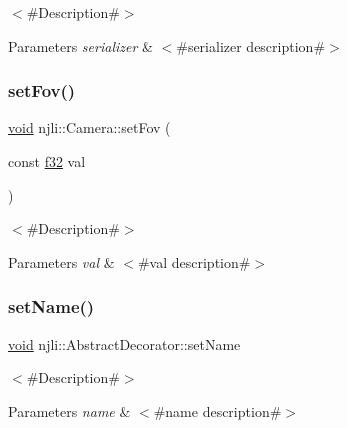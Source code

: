 $<$\#\+Description\#$>$


\begin{DoxyParams}{Parameters}
{\em serializer} & $<$\#serializer description\#$>$ \\
\hline
\end{DoxyParams}
\mbox{\label{classnjli_1_1_camera_a249c6432aa9c8809a92012a272ec6d28}} 
\subsubsection{\texorpdfstring{set\+Fov()}{setFov()}}
{\footnotesize\ttfamily \mbox{\hyperlink{_thread_8h_af1e856da2e658414cb2456cb6f7ebc66}{void}} njli\+::\+Camera\+::set\+Fov (\begin{DoxyParamCaption}\item[{const \mbox{\hyperlink{_util_8h_a5f6906312a689f27d70e9d086649d3fd}{f32}}}]{val }\end{DoxyParamCaption})}

$<$\#\+Description\#$>$


\begin{DoxyParams}{Parameters}
{\em val} & $<$\#val description\#$>$ \\
\hline
\end{DoxyParams}
\mbox{\label{classnjli_1_1_camera_a087eb5f8d9f51cc476f12f1d10a3cb95}} 
\subsubsection{\texorpdfstring{set\+Name()}{setName()}}
{\footnotesize\ttfamily \mbox{\hyperlink{_thread_8h_af1e856da2e658414cb2456cb6f7ebc66}{void}} njli\+::\+Abstract\+Decorator\+::set\+Name}

$<$\#\+Description\#$>$


\begin{DoxyParams}{Parameters}
{\em name} & $<$\#name description\#$>$ \\
\hline
\end{DoxyParams}
\mbox{\label{classnjli_1_1_camera_ab5aa8d0d534c0745146ed0d84f72fa18}} 
